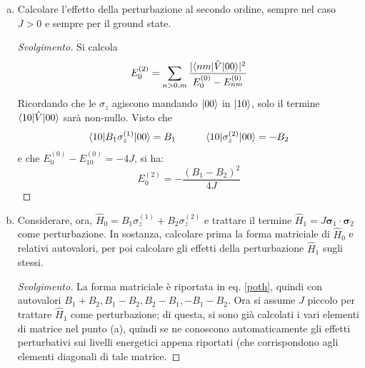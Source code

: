 \documentclass[11pt, a4paper]{scrartcl} %
\numberwithin{equation}{subsection}
\theoremstyle{style2}
\theoremstyle{style1}
\renewcommand\qedsymbol{$\blacksquare$}
\newenvironment{svolgimento}{\renewcommand\qedsymbol{$\spadesuit$}\begin{proof}[Svolgimento]}{\end{proof}}
\begin{document}
\begin{enumerate}[(a).]
\begin{svolgimento}
		Per trattare $\hat{V}$ come perturbazione, si stanno assumendo $\lvert B_1 \rvert , \lvert B_2 \rvert \ll 1$.
		Il ground state di energia $- 3J$ \`e $\ket{00} = \frac{\ket{\uparrow\downarrow} - \ket{\downarrow\uparrow} }{\sqrt{2}} $, quindi il primo ordine perturbativo \`e dato da:
		\[
		\Braket{ 00| B_1 \sigma ^{(1)} _z + B_2 \sigma _z^{(2)} |00} = 0
		\] 
	Questo risultato \`e giustificato dal fatto che 
	\[
	\sigma ^{(1)} _z \frac{\ket{\uparrow\downarrow} - \ket{\downarrow\uparrow} }{\sqrt{2} } = \frac{\ket{\uparrow\downarrow} + \ket{\downarrow\uparrow} }{\sqrt{2} }
	\] 
	quindi, applicando il bra a sinistra, i due sono ortogonali e si ottiene $0$. 
	Lo stesso vale per $\sigma ^{(2)} _z$.
Questo era anche intuibile perch\'e sviluppando la radice per $B_1,B_2$ piccoli, si vede che la correzione \`e quadratica in $B_1$ e $B_2$.
	\end{svolgimento}
\item Calcolare l'effetto della perturbazione al secondo ordine, sempre nel caso $J >0$ e sempre per il ground state.	
	\begin{svolgimento}
		Si calcola 
		\[
		E^{(2)} _0 = \sum_{n>0,m}^{} \frac{\lvert \braket{nm|\hat{V}|00}  \rvert ^2}{E^{(0)} _0 - E_{nm} ^{(0)} }
		\] 
		Ricordando che le $\sigma _z$ agiscono mandando $\ket{00} $ in $\ket{10} $, solo il termine $\braket{10|\hat{V}|00} $ sar\`a non-nullo.
		Visto che
		\[
		\braket{10|B_1 \sigma ^{(1)} _z|00} = B_1 \hspace{1cm}\braket{ 10|\sigma ^{(2)} _z |00} = - B_2
		\] 
		e che $E_0^{(0)} - E_{10} ^{(0)}  = -4J$, si ha:
		\[
		E^{(2)} _0 =- \frac{(B_1-B_2)^2}{4J} 
		\] 
	\end{svolgimento}
\item Considerare, ora, $\hat{H} _0 = B_1 \sigma ^{(1)} _z + B_2 \sigma ^{(2)} _z$ e trattare il termine $\hat{H}_1 = J \pmb{\sigma } _1 \cdot \pmb{\sigma } _2$ come perturbazione.
	In sostanza, calcolare prima la forma matriciale di $\hat{H}_0$ e relativi autovalori, per poi calcolare gli effetti della perturbazione $\hat{H}_1$ sugli stessi.
	\begin{svolgimento}
		La forma matriciale \`e riportata in eq. \ref{poth}, quindi con autovalori $B_1+B_2, B_1-B_2, B_2-B_1, -B_1-B_2$.
		Ora si assume $J$ piccolo per trattare $\hat{H}_1$ come perturbazione; di questa, si sono gi\`a calcolati i vari elementi di matrice nel punto (a), quindi se ne conoscono automaticamente gli effetti perturbativi sui livelli energetici appena riportati (che corrispondono agli elementi diagonali di tale matrice.
	\end{svolgimento}
\end{enumerate}
\end{document}
